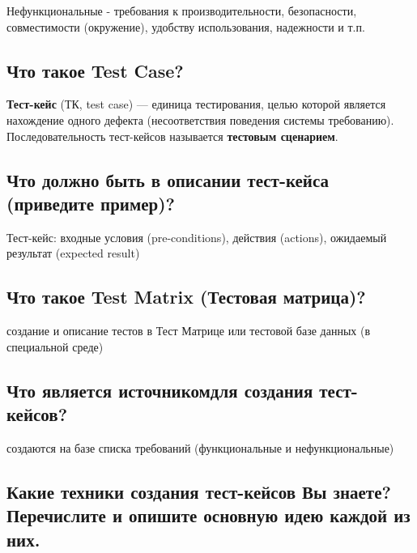 Нефункциональные - требования к производительности, безопасности, совместимости
(окружение), удобству использования, надежности и т.п.



\subsection{Что такое Test Case?}

\textbf{Тест-кейс} (ТК, test case) --- единица тестирования, целью которой
является нахождение одного дефекта (несоответствия поведения системы
требованию). Последовательность тест-кейсов называется \textbf{тестовым
сценарием}.

\subsection{Что должно быть в описании тест-кейса (приведите пример)?}

Тест-кейс: входные условия (pre-conditions), действия (actions\steps),
ожидаемый результат (expected result)

\subsection{Что такое Test Matrix (Тестовая матрица)?}

создание и описание тестов в Тест Матрице или тестовой базе данных (в
специальной среде)

\subsection{Что является источником для создания тест-кейсов? }

создаются на базе списка требований (функциональные и нефункциональные) 


\subsection{Какие техники создания тест-кейсов Вы знаете? Перечислите и опишите
основную идею каждой из них.}

